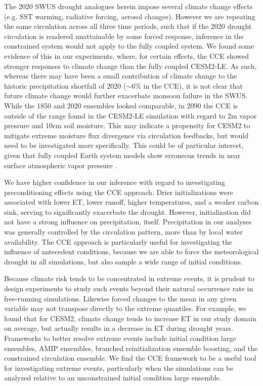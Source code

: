 \documentclass[draft]{agujournal2019}
\begin{document}
The 2020 SWUS drought analogues herein impose several climate change effects (e.g. SST warming, radiative forcing, aerosol changes).
However we are repeating the same circulation across all three time periods, such that if the 2020 drought circulation is rendered unattainable by some forced response, inference in the constrained system would not apply to the fully coupled system.
We found some evidence of this in our experiments, where, for certain effects, the CCE showed stronger responses to climate change than the fully coupled CESM2-LE.
As such, whereas there may have been a small contribution of climate change to the historic precipitation shortfall of 2020 ($\sim$6$\%$ in the CCE), it is not clear that future climate change would further exacerbate monsoon failure in the SWUS. 
While the 1850 and 2020 ensembles looked comparable, in 2090 the CCE is outside of the range found in the CESM2-LE simulation with regard to 2m vapor pressure and 10cm soil moisture.
This may indicate a propensity for CESM2 to mitigate extreme moisture flux divergence via circulation feedbacks, but would need to be investigated more specifically.
This could be of particular interest, given that fully coupled Earth system models show erroneous trends in near surface atmospheric vapor pressure \cite{simpson2024}.

We have higher confidence in our inference with regard to investigating preconditioning effects using the CCE approach.
Drier initializations were associated with lower ET, lower runoff, higher temperatures, and a weaker carbon sink, serving to significantly exacerbate the drought.
However, initialization did not have a strong influence on precipitation, itself. 
Precipitation in our analyses was generally controlled by the circulation pattern, more than by local water availability.
The CCE approach is particularly useful for investigating the influence of antecedent conditions, because we are able to force the meteorological drought in all simulations, but also sample a wide range of initial conditions.

Because climate risk tends to be concentrated in extreme events, it is prudent to design experiments to study such events beyond their natural occurrence rate in free-running simulations.
Likewise forced changes to the mean in any given variable may not transpose directly to the extreme quantiles. 
For example, we found that for CESM2, climate change tends to increase ET in our study domain on average, but actually results in a decrease in ET during drought years. 
Frameworks to better resolve extreme events include initial condition large ensembles, AMIP ensembles, branched reinitialization ensemble boosting, and the constrained circulation ensemble.
We find the CCE framework to be a useful tool for investigating extreme events, particularly when the simulations can be analyzed relative to an unconstrained initial condition large ensemble.
\end{document}
